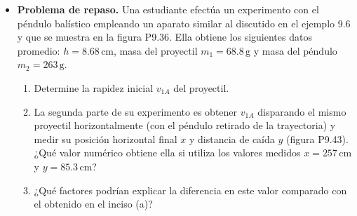 \documentclass[11pt,a4paper]{article}
\begin{document}
\begin{itemize}
    \item[\textbf{43.}] \textbf{Problema de repaso.} Una estudiante efectúa un experimento con el péndulo balístico empleando un aparato similar al discutido en el ejemplo 9.6 y que se muestra en la figura P9.36. Ella obtiene los siguientes datos promedio: \(h = 8.68\,\text{cm}\), masa del proyectil \(m_1 = 68.8\,\text{g}\) y masa del péndulo \(m_2 = 263\,\text{g}\).
    \begin{enumerate}
        \item Determine la rapidez inicial \(v_{1A}\) del proyectil.
        \item La segunda parte de su experimento es obtener \(v_{1A}\) disparando el mismo proyectil horizontalmente (con el péndulo retirado de la trayectoria) y medir su posición horizontal final \(x\) y distancia de caída \(y\) (figura P9.43). ¿Qué valor numérico obtiene ella si utiliza los valores medidos \(x = 257\,\text{cm}\) y \(y = 85.3\,\text{cm}\)?
        \item ¿Qué factores podrían explicar la diferencia en este valor comparado con el obtenido en el inciso (a)?
    \end{enumerate}
    \vspace*{7cm}
\end{itemize}

\newpage
\end{document}
